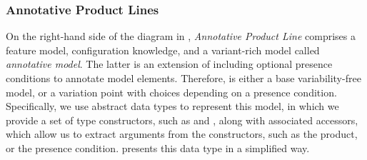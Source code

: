 









\subsubsection{Annotative Product Lines}

On the right-hand side of the diagram in , \textit{Annotative Product Line} comprises a feature model, configuration knowledge, and a variant-rich model called \textit{annotative model}. The latter is an extension of  including optional presence conditions to annotate model elements.
Therefore,  is either a base variability-free  model, or a variation point with choices depending on a presence condition. 
Specifically, we use abstract data types to represent this model, in which we provide a set of type constructors, such as  and , along with associated accessors, which allow us to extract arguments from the constructors, such as the product, or the presence condition.  presents this data type in a simplified way.

